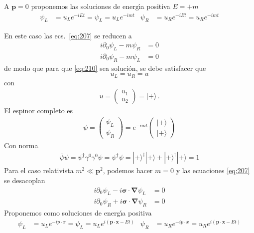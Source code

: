 \begin{subappendices}
A $\mathbf{p}=0$ proponemos las soluciones de energ\'\i a positiva $E=+m$
\begin{align}
  \label{eq:210}
  \psi_L&=u_L e^{-i E t}=\psi_L=u_L e^{-i m t} & \psi_R&=u_R e^{-i E t}=u_R e^{-i m t}
\end{align}

En este caso las ecs.~\eqref{eq:207} se reducen a
\begin{align}
  i\partial_0\psi_L -m\psi_R &=0\nonumber\\
  i\partial_0\psi_R -m\psi_L &=0
\end{align}
de modo que para que \eqref{eq:210} sea soluci\'on, se debe satisfacer que 
\begin{equation}
  u_L=u_R=u
\end{equation}
con
\begin{align}
  u=  \begin{pmatrix}
    u_1\\
    u_2    
  \end{pmatrix}=|+\rangle\,.
\end{align}
El espinor completo es
\begin{align}
  \psi=\begin{pmatrix}
    \psi_L\\
    \psi_R
  \end{pmatrix}=e^{-i m t}\begin{pmatrix}
    |+\rangle\\
    |+\rangle
  \end{pmatrix}
\end{align}
Con norma
\begin{align}
  \bar{\psi}\psi=\psi^\dagger\gamma^0\gamma^0\psi=\psi^\dagger\psi=|+\rangle^\dagger|+\rangle+|+\rangle^\dagger|+\rangle=1
\end{align}
Para el caso relativista $m^2\ll\mathbf{p}^2$, podemos hacer $m=0$ y las ecuaciones \eqref{eq:207} se desacoplan
\begin{align}
  \label{eq:211}
   i\partial_0\psi_L-i\boldsymbol{\sigma}\cdot\boldsymbol{\nabla}\psi_L &=0\nonumber\\
   i\partial_0\psi_R+i\boldsymbol{\sigma}\cdot\boldsymbol{\nabla}\psi_R&=0
\end{align}
Proponemos como soluciones de energ\'\i a positiva
\begin{align}
  \label{eq:212}
    \psi_L&=u_L e^{-i p\cdot x}=\psi_L=u_L e^{i(\mathbf{p}\cdot \mathbf{x}-E t)} & \psi_R&=u_R e^{-i p\cdot x}=u_R e^{i(\mathbf{p}\cdot \mathbf{x}-E t)}
\end{align}

\end{subappendices}
